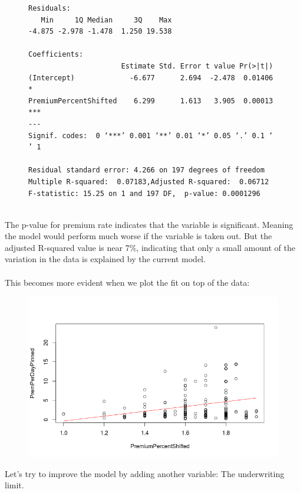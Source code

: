 \documentclass{article}
\begin{document}
\begin{figure}[H]
\centering
\begin{BVerbatim}
Residuals:
   Min     1Q Median     3Q    Max 
-4.875 -2.978 -1.478  1.250 19.538 

Coefficients:
                      Estimate Std. Error t value Pr(>|t|)    
(Intercept)             -6.677      2.694  -2.478  0.01406 *  
PremiumPercentShifted    6.299      1.613   3.905  0.00013 ***
---
Signif. codes:  0 ‘***’ 0.001 ‘**’ 0.01 ‘*’ 0.05 ‘.’ 0.1 ‘ ’ 1

Residual standard error: 4.266 on 197 degrees of freedom
Multiple R-squared:  0.07183,Adjusted R-squared:  0.06712 
F-statistic: 15.25 on 1 and 197 DF,  p-value: 0.0001296
\end{BVerbatim}
\end{figure}
~\\
The p-value for premium rate indicates that the variable is significant.  Meaning the 
model would perform much worse if the variable is taken out. But the adjusted R-squared value is
near 7\%, indicating that only a small amount of the variation in the data is explained by the current model.
~\\
~\\
This becomes more evident when we plot the fit on top of the data:

\begin{figure}[H]
\centering
\includegraphics[width=0.45\paperwidth]{pinnedPremPerDay.png}
\end{figure}


Let's try to improve the model by adding another variable: The underwriting limit. \\
\end{document}
